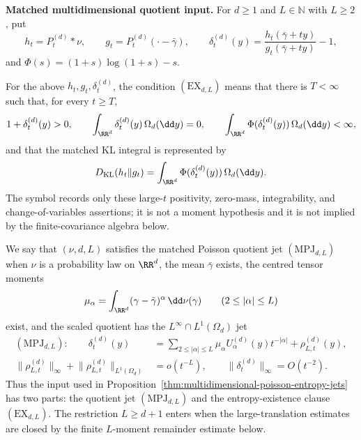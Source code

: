 \medskip
\noindent\textbf{Matched multidimensional quotient input.}
For \(d\ge1\) and \(L\in\mathbb N\) with \(L\ge2\), put
\[
h_t=P_t^{(d)}*\nu,\qquad
g_t=P_t^{(d)}(\cdot-\bar{\gamma}),\qquad
\delta_t^{(d)}(y)=
\frac{h_t(\bar{\gamma}+ty)}{g_t(\bar{\gamma}+ty)}-1,
\]
and \(\Phi(s)=(1+s)\log(1+s)-s\).

\begin{definition}%
\label{def:multidim-ex-dl}
For the above \(h_t,g_t,\delta_t^{(d)}\), the condition
\((\mathrm{EX}_{d,L})\) means that there is \(T<\infty\) such that, for every
\(t\ge T\),
\[
1+\delta_t^{(d)}(y)>0,\qquad
\int_{\RR^d}\delta_t^{(d)}(y)\,\Omega_d(\dd y)=0,\qquad
\int_{\RR^d}\Phi(\delta_t^{(d)}(y))\,\Omega_d(\dd y)<\infty,
\]
and that the matched KL integral is represented by
\[
D_{\rm KL}(h_t\|g_t)
=\int_{\RR^d}\Phi(\delta_t^{(d)}(y))\,\Omega_d(\dd y).
\]
The symbol records only these large-\(t\) positivity, zero-mass,
integrability, and change-of-variables assertions; it is not a moment
hypothesis and it is not implied by the finite-covariance algebra below.
\end{definition}

We say that \((\nu,d,L)\) satisfies the matched Poisson quotient jet
\((\mathrm{MPJ}_{d,L})\) when \(\nu\) is a probability law on \(\RR^d\), the
mean \(\bar{\gamma}\) exists, the centred tensor moments
\[
\mu_\alpha=\int_{\RR^d}(\gamma-\bar{\gamma})^\alpha\,\dd\nu(\gamma)
\qquad(2\le|\alpha|\le L)
\]
exist, and the scaled quotient has the \(L^\infty\cap L^1(\Omega_d)\) jet
\begin{equation}\label{eq:mpj-dl-definition}
\begin{aligned}
(\mathrm{MPJ}_{d,L}):\qquad
\delta_t^{(d)}(y)
&=
\sum_{2\le\lvert\alpha\rvert\le L}
\mu_\alpha U_\alpha^{(d)}(y)t^{-\lvert\alpha\rvert}
+\rho_{L,t}^{(d)}(y),\\
\lVert\rho_{L,t}^{(d)}\rVert_\infty+
\lVert\rho_{L,t}^{(d)}\rVert_{L^1(\Omega_d)}
&=o(t^{-L}),\qquad
\lVert\delta_t^{(d)}\rVert_\infty=O(t^{-2}).
\end{aligned}
\end{equation}
Thus the input used in
Proposition~\ref{thm:multidimensional-poisson-entropy-jets} has two parts:
the quotient jet \((\mathrm{MPJ}_{d,L})\) and the entropy-existence clause
\((\mathrm{EX}_{d,L})\).  The restriction \(L\ge d+1\) enters when the
large-translation estimates are closed by the finite \(L\)-moment remainder
estimate below.

